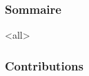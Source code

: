 \documentclass[ignorenonframetext, 8pt, allowframebreaks]{beamer}
\title[\ushorttitle]{\utitle}
\author[\uauthortwitter]{ \uauthor \\ \medskip {\small \url{\umaila} \and \url{\umailb}\\ {\small \url{\usitea}}}}
\institute[\uinstituteshort]{\uinstitute \\ \uchaire}
\date[\uversion]{Date de publication\\ \today}
\begin{document}
\begin{frame}[plain]
 \titlepage
\end{frame}
\begin{frame}
 \frametitle{Sommaire}
 \tableofcontents
 \end{frame}
 
\mode<all>{\ubody}

\begin{frame}
 \frametitle{Contributions}

 \end{frame}
\end{document}
